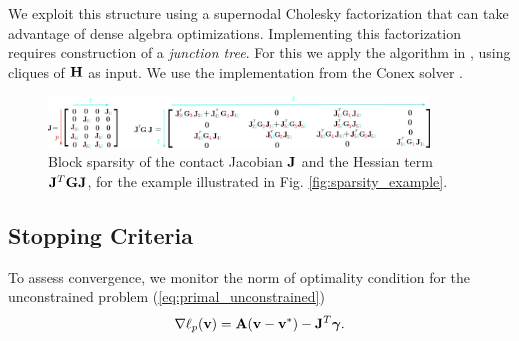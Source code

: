 We exploit this structure using a supernodal Cholesky factorization \cite[\S
9]{bib:davis2016survey} that can take advantage of dense algebra optimizations.
Implementing this factorization requires construction of a \emph{junction tree}.
For this we apply the algorithm in \cite{bib:smail2017junction}, using cliques
of ${\mathbf{H}}$ as input. We use the implementation from the Conex solver
\cite{bib:permenter2020}.
\begin{figure}[!h]
	\centering
	\includegraphics[width=0.9\textwidth]{figures/schematics/jacobian_and_JTGJ.png}
	\caption{\label{fig:JTGJ_schematic} 
	Block sparsity of the contact Jacobian ${\mathbf{J}}$ and the Hessian term
	${\mathbf{J}}^T{\mathbf{G}}{\mathbf{J}}$, for the example illustrated in Fig.
	\ref{fig:sparsity_example}.}
\end{figure}


\subsection{Stopping Criteria}
\label{sec:stopping_criteria}

To assess convergence, we monitor the norm of optimality condition for the
unconstrained problem (\ref{eq:primal_unconstrained})
\begin{equation*}
	\nabla\ell_p({\mathbf{v}}) = {\mathbf{A}}({\mathbf{v}}-{\mathbf{v}}^*) - {\mathbf{J}}^T{\bm\gamma}.
\end{equation*}

